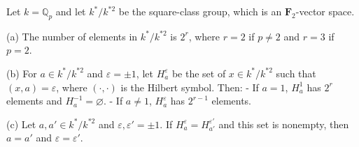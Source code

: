 Let $k = \mathbb{Q}_p$ and let $k^*/k^{*2}$ be the square-class group, which is an $\mathbf{F}_2$-vector space.

(a) The number of elements in $k^*/k^{*2}$ is $2^r$, where $r = 2$ if $p \neq 2$ and $r = 3$ if $p = 2$.

(b) For $a \in k^*/k^{*2}$ and $\varepsilon = \pm 1$, let $H_a^\varepsilon$ be the set of $x \in k^*/k^{*2}$ such that $(x, a) = \varepsilon$, where $(\cdot, \cdot)$ is the Hilbert symbol. Then:
- If $a = 1$, $H_a^1$ has $2^r$ elements and $H_a^{-1} = \varnothing$.
- If $a \neq 1$, $H_a^\varepsilon$ has $2^{r-1}$ elements.

(c) Let $a, a' \in k^*/k^{*2}$ and $\varepsilon, \varepsilon' = \pm 1$. If $H_a^\varepsilon = H_{a'}^{\varepsilon'}$ and this set is nonempty, then $a = a'$ and $\varepsilon = \varepsilon'$.
